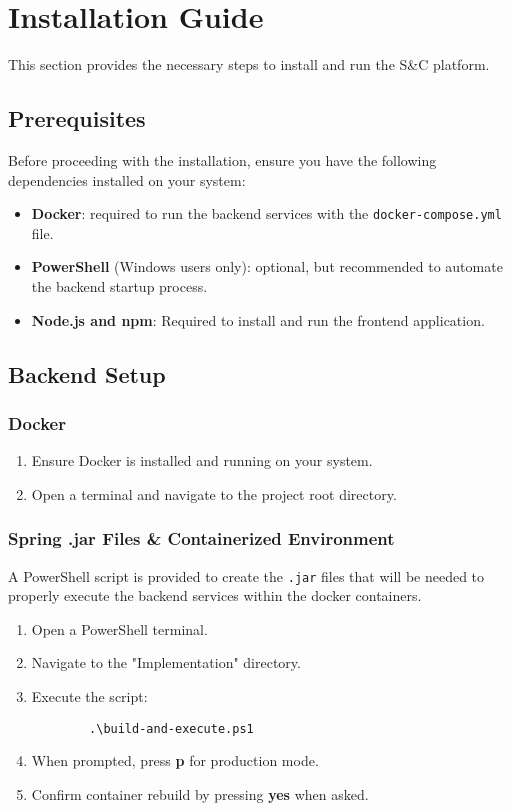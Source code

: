 \section{Installation Guide}

This section provides the necessary steps to install and run the S\&C platform.

\subsection{Prerequisites}

Before proceeding with the installation, ensure you have the following dependencies installed on your system:

\begin{itemize}
    \item \textbf{Docker}: required to run the backend services with the \verb|docker-compose.yml| file.
    \item \textbf{PowerShell} (Windows users only): optional, but recommended to automate the backend startup process.
    \item \textbf{Node.js and npm}: Required to install and run the frontend application.
\end{itemize}


\subsection{Backend Setup}
\subsubsection*{Docker}

\begin{enumerate}
    \item Ensure Docker is installed and running on your system.
    \item Open a terminal and navigate to the project root directory.

\end{enumerate}
\subsubsection*{Spring .jar Files \& Containerized Environment }

A PowerShell script is provided to create the \verb|.jar| files that will be needed to properly execute the backend services within the docker containers. 

\begin{enumerate}
    \item Open a PowerShell terminal.
    \item Navigate to the "Implementation" directory.
    \item Execute the script: 
    \begin{verbatim}
        .\build-and-execute.ps1
    \end{verbatim}

    \item When prompted, press \textbf{p} for production mode.
    \item Confirm container rebuild by pressing \textbf{yes} when asked.
\end{enumerate}

